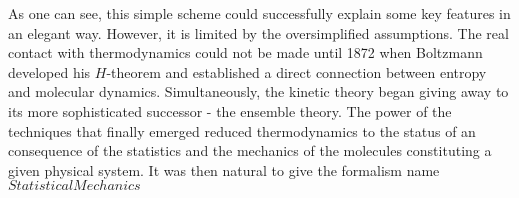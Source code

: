 As one can see, this simple scheme could successfully explain some key features in an elegant way. 
However, it is limited by the oversimplified assumptions.
The real contact with thermodynamics could not be made until 1872 when Boltzmann developed his $H$-theorem and established a direct connection between entropy and molecular dynamics. 
Simultaneously, the kinetic theory began giving away to its more sophisticated successor - the ensemble theory.
The power of the techniques that finally emerged reduced thermodynamics to the status of an consequence of the statistics and the mechanics of the molecules constituting a given physical system.
It was then natural to give the formalism name $Statistical Mechanics$

%

